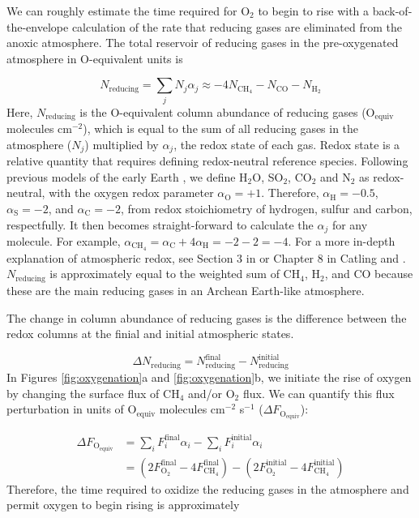 We can roughly estimate the time required for O$_2$ to begin to rise with a back-of-the-envelope calculation of the rate that reducing gases are eliminated from the anoxic atmosphere. The total reservoir of reducing gases in the pre-oxygenated atmosphere in O-equivalent units is

\begin{equation} 
  N_\mathrm{reducing} = \sum_j N_j \alpha_j \approx -4 N_\mathrm{CH_4} - N_\mathrm{CO} - N_\mathrm{H_2} 
\end{equation}
Here, $N_\mathrm{reducing}$ is the O-equivalent column abundance of reducing gases (O$_\mathrm{equiv}$ molecules cm$^{-2}$), which is equal to the sum of all reducing gases in the atmosphere ($N_j$) multiplied by $\alpha_j$, the redox state of each gas. Redox state is a relative quantity that requires defining redox-neutral reference species. Following previous models of the early Earth \citep{Zahnle_2006}, we define H$_2$O, SO$_2$, CO$_2$ and N$_2$ as redox-neutral, with the oxygen redox parameter $\alpha_\mathrm{O} = +1$. Therefore, $\alpha_\mathrm{H} = -0.5$, $\alpha_\mathrm{S} = -2$, and $\alpha_\mathrm{C} = -2$, from redox stoichiometry of hydrogen, sulfur and carbon, respectfully. It then becomes straight-forward to calculate the $\alpha_j$ for any molecule. For example, $\alpha_\mathrm{CH_4} = \alpha_\mathrm{C} + 4\alpha_\mathrm{H} = -2 - 2 = - 4$. For a more in-depth explanation of atmospheric redox, see Section 3 in \citet{Harman_2015} or Chapter 8 in Catling and \citet{Catling_2017}. $N_\mathrm{reducing}$ is approximately equal to the weighted sum of CH$_4$, H$_2$, and CO because these are the main reducing gases in an Archean Earth-like atmosphere.

The change in column abundance of reducing gases is the difference between the redox columns at the finial and initial atmospheric states.

\begin{equation} 
  \Delta N_\mathrm{reducing} = N_\mathrm{reducing}^\text{final} - N_\mathrm{reducing}^\text{initial}
\end{equation}
In Figures \ref{fig:oxygenation}a and \ref{fig:oxygenation}b, we initiate the rise of oxygen by changing the surface flux of CH$_4$ and/or O$_2$ flux. We can quantify this flux perturbation in units of O$_\mathrm{equiv}$ molecules cm$^{-2}$ s$^{-1}$ ($\Delta F_\mathrm{O_{equiv}}$):

\begin{equation}
\begin{split}
  \Delta F_\mathrm{O_{equiv}} &= \sum_i F_i^\text{final} \alpha_i - \sum_i F_i^\text{initial} \alpha_i \\ 
  &= (2 F_\mathrm{O_2}^\text{final} - 4 F_\mathrm{CH_4}^\text{final}) - (2 F_\mathrm{O_2}^\text{initial} - 4 F_\mathrm{CH_4}^\text{initial})
\end{split}
\end{equation}
Therefore, the time required to oxidize the reducing gases in the atmosphere and permit oxygen to begin rising is approximately

